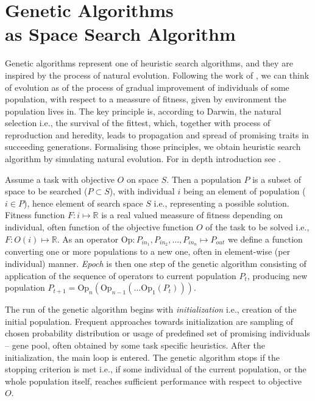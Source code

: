 \section[Genetic Algorithms as Space Search Algorithm]{Genetic Algorithms \\ as Space Search Algorithm}
\label{sec:ga_theory}
Genetic algorithms represent one of heuristic search algorithms, and they are inspired by the process of natural evolution. Following the work of \cite{darwin1859}, we can think of evolution as of the process of gradual improvement of individuals of some population, with respect to a meassure of fitness, given by environment the population lives in. The key principle is, according to Darwin, the natural selection i.e., the survival of the fittest, which, together with process of reproduction and heredity, leads to propagation and spread of promising traits in succeeding generations. Formalising those principles, we obtain heuristic search algorithm by simulating natural evolution. For in depth introduction see \cite{evolution}.

Assume a task with objective $O$ on space $S$. Then a population $P$ is a subset of space to be searched ($P \subset S$), with individual $i$ being an element of population ($i \in P$), hence element of search space $S$ i.e., representing a possible solution. Fitness function $F: i \mapsto \mathbb{R}$ is a real valued meassure of fitness depending on individual, often function of the objective function $O$ of the task to be solved i.e., $F: O(i) \mapsto \mathbb{R}$. As an operator $\text{Op}: P_{in_1}, P_{in_2}, \dots, P_{in_n} \mapsto P_{out}$ we define a function converting one or more populations to a new one, often in element-wise (per individual) manner. \emph{Epoch} is then one step of the genetic algorithm consisting of application of the sequence of operators to current population $P_t$, producing new population $P_{t+1} = \text{Op}_n\left(\text{Op}_{n-1}\left(\dots \text{Op}_1(P_t)\right)\right)$.

The run of the genetic algorithm begins with \emph{initialization} i.e., creation of the initial population. Frequent approaches towards initialization are sampling of chosen probability distribution or usage of predefined set of promising individuals -- gene pool, often obtained by some task specific heuristics. After the initialization, the main loop is entered. The genetic algorithm stops if the stopping criterion is met i.e., if some individual of the current population, or the whole population itself, reaches sufficient performance with respect to objective~$O$.

